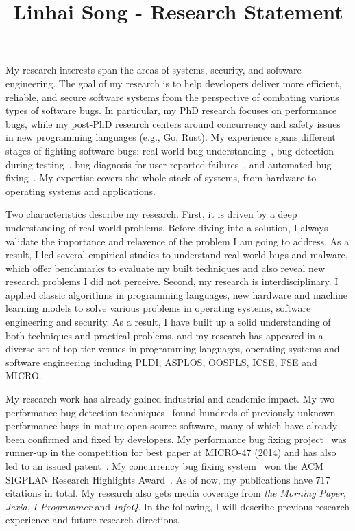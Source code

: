 \documentclass[10pt]{article}
\title{\vspace{-.7in}\bf{Linhai Song - Research Statement\vspace{-.4in}}}
\date{}
\begin{document}
\maketitle\vspace{-.2in}

My research interests span the areas of systems, security, and software engineering.
The goal of my research is to help developers deliver more efficient, reliable, and secure software systems
from the perspective of combating various types of software bugs.  
In particular, my PhD research focuses on performance bugs, while my post-PhD
research centers around concurrency and safety issues in new programming languages (e.g., Go, Rust).
My experience spans different stages of fighting software bugs:
real-world bug understanding~\cite{jin12perfbug,go-asplos,yu2019fearless,sosp-boqin}, 
bug detection during testing~\cite{jin12perfbug,Nistor13ICSE,icse-boqin}, 
bug diagnosis for user-reported failures~\cite{Song14OOPSLA,Song17ICSE}, 
and automated bug fixing~\cite{jin11afix,Song14MICRO}. 
My expertise covers the whole stack of systems, 
from hardware to operating systems and applications. 

Two characteristics describe my research. 
First, it is driven by a deep understanding of real-world problems. 
Before diving into a solution, 
I always validate the importance and relavence of 
the problem I am going to address. 
As a result, I led several empirical studies to understand real-world bugs and 
malware, which offer benchmarks to evaluate my built techniques 
and also reveal new research problems I did not perceive.
Second, my research is interdisciplinary.
I applied classic algorithms in programming languages, 
new hardware and machine learning models to solve various problems 
in operating systems, software engineering and security. 
As a result, I have built up a solid understanding of both 
techniques and practical problems, and my research
has appeared in a diverse set of top-tier 
venues in programming languages, 
operating systems and software engineering including 
PLDI, ASPLOS, OOSPLS, ICSE, FSE and MICRO.

My research work has already gained industrial and academic impact. 
My two performance bug detection techniques~\cite{jin12perfbug, Nistor13ICSE} 
found hundreds of previously unknown performance bugs in mature open-source software, 
many of which have already been confirmed and fixed by developers. 
My performance bug fixing project~\cite{Song14MICRO} was 
runner-up in the competition 
for best paper at MICRO-47 (2014)
and has also led to an issued patent~\cite{comppatent}.
My concurrency bug fixing system~\cite{jin11afix} won 
the ACM SIGPLAN Research Highlights Award~\cite{afixnom}. 
As of now, my publications have 717 citations in total. 
My research also gets media coverage 
from {\it the Morning Paper}, {\it Jexia}, 
{\it I Programmer} and {\it InfoQ}.
In the following, I will describe previous research experience 
and future research directions. 
\end{document}
